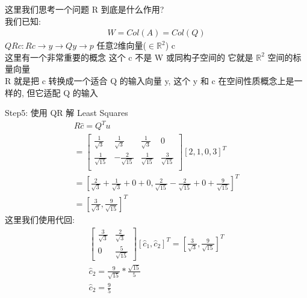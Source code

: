 \documentclass[12pt]{article}
\begin{document}
\begin{flushleft}
    这里我们思考一个问题 R 到底是什么作用? \\
    我们已知: \\
    \begin{align}
        W = Col(A) = Col(Q)
    \end{align}
    $QRc: Rc \to y \to Qy \to p$
    任意2维向量($\in \mathbb{R}^{2}$) c  \\
    这里有一个非常重要的概念 这个 c 不是 W 或同构子空间的 它就是 $\mathbb{R}^{2}$ 空间的标量向量 \\
    R 就是把 c 转换成一个适合 Q 的输入向量 y, 这个 y 和 c 在空间性质概念上是一样的, 但它适配 Q 的输入


    Step5: 使用 QR 解  Least Squares \\
    \begin{align}
        R\hat{c} = Q^{T}u                                                                                                                                \\
        = \begin{bmatrix}
              \frac{1}{\sqrt{3}}  & \frac{1}{\sqrt{3}}   & \frac{1}{\sqrt{3}}  & 0                   \\
              \frac{1}{\sqrt{15}} & -\frac{2}{\sqrt{15}} & \frac{1}{\sqrt{15}} & \frac{3}{\sqrt{15}} \\
          \end{bmatrix} [2, 1, 0, 3]^{T} \\
        = [\frac{2}{\sqrt{3}} + \frac{1}{\sqrt{3}}  +  0 + 0, \frac{2}{\sqrt{15}} -\frac{2}{\sqrt{15}} + 0 + \frac{9}{\sqrt{15}}]^{T}                    \\
        = [\frac{3}{\sqrt{3}}, \frac{9}{\sqrt{15}}]^{T}
    \end{align}
    这里我们使用代回: \\
    \begin{align}
        \begin{bmatrix}
            \frac{3}{\sqrt{3}} & \frac{2}{\sqrt{3}}  \\
            0                  & \frac{5}{\sqrt{15}}
        \end{bmatrix}[\hat{c}_{1}, \hat{c}_{2}]^{T} =  [\frac{3}{\sqrt{3}}, \frac{9}{\sqrt{15}}]^{T} \\
        \hat{c}_{2} = \frac{9}{\sqrt{15}} *\frac{\sqrt{15}}{5}                                       \\
        \hat{c}_{2} = \frac{9}{5}                                                                    \\

\end{align}
\end{flushleft}
\end{document}
